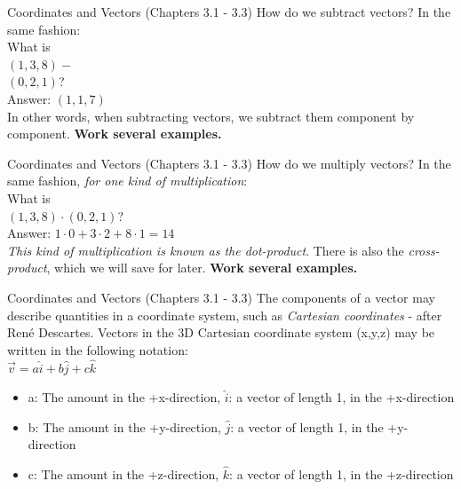 \documentclass{beamer}
\begin{document}
\begin{frame}{Coordinates and Vectors (Chapters 3.1 - 3.3)}
How do we subtract vectors? In the same fashion:\\
\vspace{0.5cm}
What is\\
$(1,3,8)-$\\ $(0,2,1)$? \\
Answer: $(1,1,7)$ \\
\vspace{0.5cm}
In other words, when subtracting vectors, we subtract them component by component. \textbf{Work several examples.}
\end{frame}

\begin{frame}{Coordinates and Vectors (Chapters 3.1 - 3.3)}
How do we multiply vectors? In the same fashion, \textit{for one kind of multiplication}:\\
\vspace{0.5cm}
What is\\
$(1,3,8)\cdot (0,2,1)$? \\
Answer: $1\cdot 0 + 3 \cdot 2 + 8 \cdot 1 = 14$ \\
\vspace{0.5cm}
\textit{This kind of multiplication is known as the dot-product}.  There is also the \textit{cross-product}, which we will save for later. \textbf{Work several examples.}
\end{frame}

\begin{frame}{Coordinates and Vectors (Chapters 3.1 - 3.3)}
\small
The components of a vector may describe quantities in a \alert{coordinate system}, such as \textit{Cartesian coordinates} - after Ren\'e Descartes.  Vectors in the 3D Cartesian coordinate system (x,y,z) may be written in the following notation:
\\
\vspace{0.2cm}
$\boxed{\vec{v} = a\hat{i} + b\hat{j} + c\hat{k}}$
\\
\begin{itemize}
\item a: The amount in the +x-direction, $\hat{i}$: a vector of length 1, in the +x-direction
\item b: The amount in the +y-direction, $\hat{j}$: a vector of length 1, in the +y-direction
\item c: The amount in the +z-direction, $\hat{k}$: a vector of length 1, in the +z-direction
\end{itemize}
\end{frame}
\end{document}
